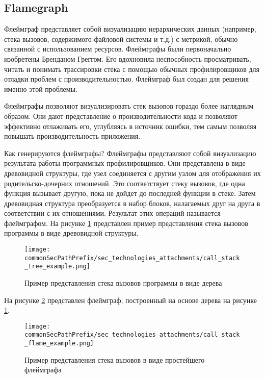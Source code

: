 \subsection{Flamegraph}
Флеймграф представляет собой  визуализацию иерархических данных (например, стека вызовов, 
содержимого файловой системы и т.д.) с метрикой, обычно связанной с использованием ресурсов. 
Флеймграфы были первоначально изобретены Бренданом Греггом. Его вдохновила неспособность просматривать, 
читать и понимать трассировки стека с помощью обычных профилировщиков для отладки проблем с производительностью. 
Флеймграф был создан для решения именно этой проблемы.

Флеймграфы позволяют визуализировать стек вызовов гораздо более наглядным образом. Они дают представление 
о производительности кода и позволяют эффективно отлаживать его, углубляясь в источник ошибки, тем самым позволяя
повышать производительность приложения. 

Как генерируются флеймграфы?
Флеймграфы представляют собой визуализацию результата работы программных профилировщиков. 
Они представлена в виде древовидной структуры, где узел соединяется с другим узлом для отображения их родительско-дочерних отношений. 
Это соответствует стеку вызовов, где одна функция вызывает другую, пока не дойдет до последней функции в стеке. 
Затем древовидная структура преобразуется в набор блоков, налагаемых друг на друга в соответствии с их отношениями. Результат этих операций называется флеймграфом.
На рисунке \ref{sec_tech:fig:flamegraph_tree} представлен пример представления стека вызовов программы в виде древовидной структуры.

\begin{figure}[H]
    \centering
    \texttt{[image: \\commonSecPathPrefix/sec\_technologies\_attachments/call\_stack\_tree\_example.png]}
    \caption{Пример представления стека вызовов программы в виде дерева}
    \label{sec_tech:fig:flamegraph_tree}
\end{figure}

На рисунке \ref{sec_tech:fig:flamegraph_example_from_tree} представлен флеймграф, построенный на основе дерева на рисунке \ref{sec_tech:fig:flamegraph_tree}.

\begin{figure}[H]
    \centering
    \texttt{[image: \\commonSecPathPrefix/sec\_technologies\_attachments/call\_stack\_flame\_example.png]}
    \caption{Пример представления стека вызовов в виде простейшего флеймграфа}
    \label{sec_tech:fig:flamegraph_example_from_tree}
\end{figure}

